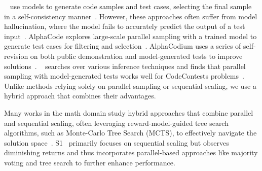 
~\citet{chen2022codet, huang2023enhancing, jiao2024preference} use models to generate code samples and test cases, selecting the final sample in a self-consistency manner~\citep{wang2022self, AceCoder}. However, these approaches often suffer from model hallucination, where the model fails to accurately predict the output of a test input~\citep{jain2024livecodebench, AceCoder,gu2024cruxeval}.
AlphaCode explores large-scale parallel sampling with a trained model to generate test cases for filtering and selection~\citep{li2022competition}. AlphaCodium uses a series of self-revision on both public demonstration and model-generated tests to improve solutions~\citep{ridnik2024code}. ~\citet{saad2024archon} searches over various inference techniques and finds that parallel sampling with model-generated tests works well for CodeContests problems~\citep{li2022competition}. Unlike methods relying solely on parallel sampling or sequential scaling, we use a hybrid approach that combines their advantages.



Many works in the math domain study hybrid approaches that combine parallel and sequential scaling, often leveraging reward-model-guided tree search algorithms, such as Monte-Carlo Tree Search (MCTS), to effectively navigate the solution space~\citep{gao2024interpretable, li2024rethinkmcts, silver2016mastering, snell2024scaling, hendrycks2021measuring}. S1~\citep{muennighoff2025s1} primarily focuses on sequential scaling but observes diminishing returns and thus incorporates parallel-based approaches like majority voting and tree search to further enhance performance.

